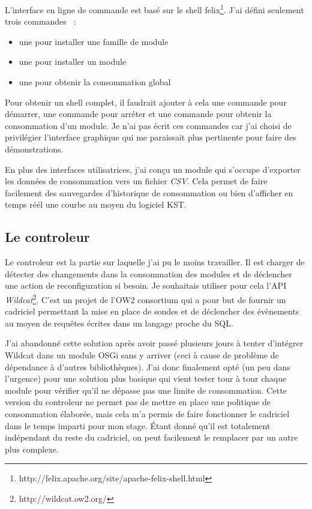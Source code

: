 \documentclass[a4paper, 11pt]{report}
\begin{document}
L'interface en ligne de commande est basé sur le shell felix\footnote{http://felix.apache.org/site/apache-felix-shell.html}. J'ai défini seulement trois commandes ~:
\begin{itemize}
  \item une pour installer une famille de module
  \item une pour installer un module
  \item une pour obtenir la consommation global
\end{itemize}
Pour obtenir un shell complet, il faudrait ajouter à cela une commande pour démarrer, une commande pour arrêter et une commande pour obtenir la consommation d'un module. Je n'ai pas écrit ces commandes car j'ai choisi de privilégier l'interface graphique qui me paraissait plus pertinente pour faire des démonstrations.

En plus des interfaces utilisatrices, j'ai conçu un module qui s'occupe d'exporter les données de consommation vers un fichier \textit{CSV}. Cela permet de faire facilement des sauvegardes d'historique de consommation ou bien d'afficher en temps réél une courbe au moyen du logiciel KST.
 
		\subsection{Le controleur}
Le controleur est la partie sur laquelle j'ai pu le moins travailler. Il est charger de détecter des changements dans la consommation des modules et de déclencher une action de reconfiguration si besoin. Je souhaitais utiliser pour cela l'API \textit{Wildcat}\footnote{http://wildcat.ow2.org/}. C'est un projet de l'OW2 consortium qui a pour but de fournir un cadriciel permettant la mise en place de sondes et de déclencher des évènements au moyen de requêtes écrites dans un langage proche du SQL.

J'ai abandonné cette solution après avoir passé plusieurs jours à tenter d'intégrer Wildcat dans un module OSGi sans y arriver (ceci  à cause de problème de dépendance à d'autres bibliothèques). J'ai donc finalement opté (un peu dans l'urgence) pour une solution plus basique qui vient tester tour à tour chaque module pour vérifier qu'il ne dépasse pas une limite de consommation. Cette version du controleur ne permet pas de mettre en place une politique de consommation élaborée, mais cela m'a permis de faire fonctionner le cadriciel dans le temps imparti pour mon stage. Étant donné qu'il est totalement indépendant du reste du cadriciel, on peut facilement le remplacer par un autre plus complexe.
   
\end{document}
